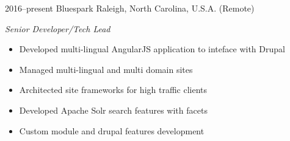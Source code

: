 \documentclass[]{friggeri-cv} %
\begin{document}
\begin{entrylist}

\entry
{2016--present}
{Bluespark}
{Raleigh, North Carolina, U.S.A. (Remote)}
{\emph{Senior Developer/Tech Lead}
\begin{itemize}
\item Developed multi-lingual AngularJS application to inteface with Drupal
\item Managed multi-lingual and multi domain sites
\item Architected site frameworks for high traffic clients
\item Developed Apache Solr search features with facets
\item Custom module and drupal features development
\end{itemize}}


\end{entrylist}
\end{document}
